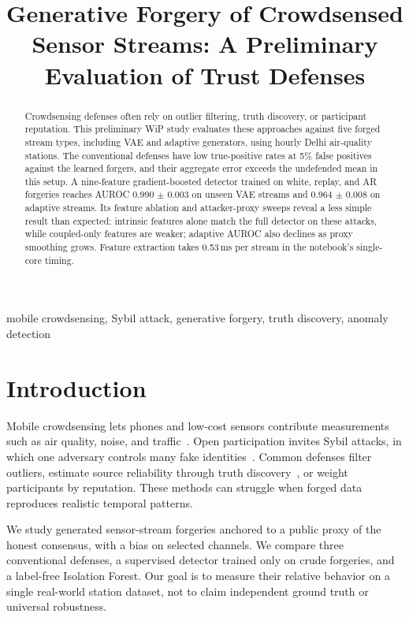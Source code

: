 \documentclass[conference]{IEEEtran}
\begin{document}
\title{Generative Forgery of Crowdsensed Sensor Streams: A Preliminary Evaluation of Trust Defenses}
\author{
}
\maketitle
\begin{abstract}
Crowdsensing defenses often rely on outlier filtering, truth discovery, or participant reputation. This preliminary WiP study evaluates these approaches against five forged stream types, including VAE and adaptive generators, using hourly Delhi air-quality stations. The conventional defenses have low true-positive rates at 5\% false positives against the learned forgers, and their aggregate error exceeds the undefended mean in this setup. A nine-feature gradient-boosted detector trained on white, replay, and AR forgeries reaches AUROC 0.990 $\pm$ 0.003 on unseen VAE streams and 0.964 $\pm$ 0.008 on adaptive streams. Its feature ablation and attacker-proxy sweeps reveal a less simple result than expected: intrinsic features alone match the full detector on these attacks, while coupled-only features are weaker; adaptive AUROC also declines as proxy smoothing grows. Feature extraction takes 0.53\,ms per stream in the notebook's single-core timing.
\end{abstract}
\begin{IEEEkeywords}
mobile crowdsensing, Sybil attack, generative forgery, truth discovery, anomaly detection
\end{IEEEkeywords}
\section{Introduction}
Mobile crowdsensing lets phones and low-cost sensors contribute measurements such as air quality, noise, and traffic~\cite{ganti2011}. Open participation invites Sybil attacks, in which one adversary controls many fake identities~\cite{douceur2002}. Common defenses filter outliers, estimate source reliability through truth discovery~\cite{li2014crh,li2016survey}, or weight participants by reputation. These methods can struggle when forged data reproduces realistic temporal patterns.

We study generated sensor-stream forgeries anchored to a public proxy of the honest consensus, with a bias on selected channels. We compare three conventional defenses, a supervised detector trained only on crude forgeries, and a label-free Isolation Forest. Our goal is to measure their relative behavior on a single real-world station dataset, not to claim independent ground truth or universal robustness.
\end{document}
